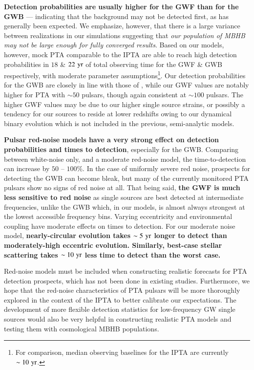 \documentclass[useAMS, usenatbib]{mnras}  %
\begin{document}
        \textbf{Detection probabilities are usually higher for the GWF than for the GWB} --- indicating that the background may not be detected first, as has generally been expected.  We emphasize, however, that there is a large variance between realizations in our simulations suggesting that \textit{our population of MBHB may not be large enough for fully converged results}.  Based on our models, however, mock PTA comparable to the IPTA are able to reach high detection probabilities in $18$ \& $22 \, \,\mathrm{yr}$ of total observing time for the GWF \& GWB respectively, with moderate parameter assumptions\footnote{For comparison, median observing baselines for the IPTA are currently $\sim 10 \, \,\mathrm{yr}$.}.  Our detection probabilities for the GWB are closely in line with those of \citet{rsg15}, while our GWF values are notably higher for PTA with $\sim 50$ pulsars, though again consistent at $\sim 100$ pulsars.  The higher GWF values may be due to our higher single source strains, or possibly a tendency for our sources to reside at lower redshifts owing to our dynamical binary evolution which is not included in the previous, semi-analytic models.

        \textbf{Pulsar red-noise models have a very strong effect on detection probabilities and times to detection}, especially for the GWB.  Comparing between white-noise only, and a moderate red-noise model, the time-to-detection can increase by $50$ -- $100\%$.  In the case of uniformly severe red noise, prospects for detecting the GWB can become bleak, but many of the currently monitored PTA pulsars show no signs of red noise at all.  That being said, \textbf{the GWF is much less sensitive to red noise} as single sources are best detected at intermediate frequencies, unlike the GWB which, in our models, is almost always strongest at the lowest accessible frequency bins.  Varying eccentricity and environmental coupling have moderate effects on times to detection.  For our moderate noise model, \textbf{nearly-circular evolution takes $\sim 5\, \,\mathrm{yr}$ longer to detect than moderately-high eccentric evolution.  Similarly, best-case stellar scattering takes $\sim 10 \, \,\mathrm{yr}$ less time to detect than the worst case.}

        Red-noise models must be included when constructing realistic forecasts for PTA detection prospects, which has not been done in existing studies.  Furthermore, we hope that the red-noise characteristics of PTA pulsars will be more thoroughly explored in the context of the IPTA to better calibrate our expectations.  The development of more flexible detection statistics for low-frequency GW single sources would also be very helpful in constructing realistic PTA models and testing them with cosmological MBHB populations.
\end{document}
